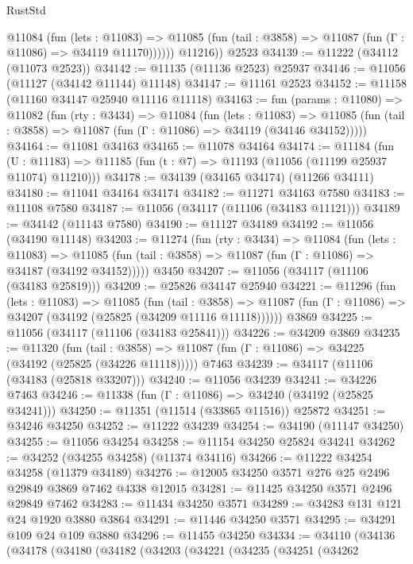 \begin{lexlean}{RustStd}
\begin{coremodule}
            @11084
              (fun (lets : @11083) =>
              @11085 (fun (tail : @3858) => @11087 (fun (Γ : @11086) => @34119 @11170))))))
        @11216))
    @2523
@34139 := @11222 (@34112 (@11073 @2523))
@34142 := @11135 (@11136 @2523) @25937
@34146 := @11056 (@11127 (@34142 @11144) @11148)
@34147 := @11161 @2523
@34152 := @11158 (@11160 @34147 @25940 @11116 @11118)
@34163 := fun (params : @11080) =>
  @11082
    (fun (rty : @3434) =>
    @11084
      (fun (lets : @11083) =>
      @11085 (fun (tail : @3858) => @11087 (fun (Γ : @11086) => @34119 (@34146 @34152)))))
@34164 := @11081 @34163
@34165 := @11078 @34164
@34174 := @11184
    (fun (U : @11183) => @11185 (fun (t : @7) => @11193 (@11056 (@11199 @25937 @11074) @11210)))
@34178 := @34139 (@34165 @34174) (@11266 @34111)
@34180 := @11041 @34164 @34174
@34182 := @11271 @34163 @7580
@34183 := @11108 @7580
@34187 := @11056 (@34117 (@11106 (@34183 @11121)))
@34189 := @34142 (@11143 @7580)
@34190 := @11127 @34189
@34192 := @11056 (@34190 @11148)
@34203 := @11274
    (fun (rty : @3434) =>
    @11084
      (fun (lets : @11083) =>
      @11085 (fun (tail : @3858) => @11087 (fun (Γ : @11086) => @34187 (@34192 @34152)))))
    @3450
@34207 := @11056 (@34117 (@11106 (@34183 @25819)))
@34209 := @25826 @34147 @25940
@34221 := @11296
    (fun (lets : @11083) =>
    @11085
      (fun (tail : @3858) =>
      @11087 (fun (Γ : @11086) => @34207 (@34192 (@25825 (@34209 @11116 @11118))))))
    @3869
@34225 := @11056 (@34117 (@11106 (@34183 @25841)))
@34226 := @34209 @3869
@34235 := @11320
    (fun (tail : @3858) => @11087 (fun (Γ : @11086) => @34225 (@34192 (@25825 (@34226 @11118)))))
    @7463
@34239 := @34117 (@11106 (@34183 (@25818 @33207)))
@34240 := @11056 @34239
@34241 := @34226 @7463
@34246 := @11338 (fun (Γ : @11086) => @34240 (@34192 (@25825 @34241)))
@34250 := @11351 (@11514 (@33865 @11516)) @25872
@34251 := @34246 @34250
@34252 := @11222 @34239
@34254 := @34190 (@11147 @34250)
@34255 := @11056 @34254
@34258 := @11154 @34250 @25824 @34241
@34262 := @34252 (@34255 @34258) (@11374 @34116)
@34266 := @11222 @34254 @34258 (@11379 @34189)
@34276 := @12005 @34250 @3571 @276 @25 @2496 @29849 @3869 @7462 @4338 @12015
@34281 := @11425 @34250 @3571 @2496 @29849 @7462
@34283 := @11434 @34250 @3571
@34289 := @34283 @131 @121 @24 @1920 @3880 @3864
@34291 := @11446 @34250 @3571
@34295 := @34291 @109 @24 @109 @3880
@34296 := @11455 @34250
@34334 := @34110
    (@34136
      (@34178
        (@34180
          (@34182
            (@34203
              (@34221
                (@34235
                  (@34251
                    (@34262

\end{coremodule}
\end{lexlean}

